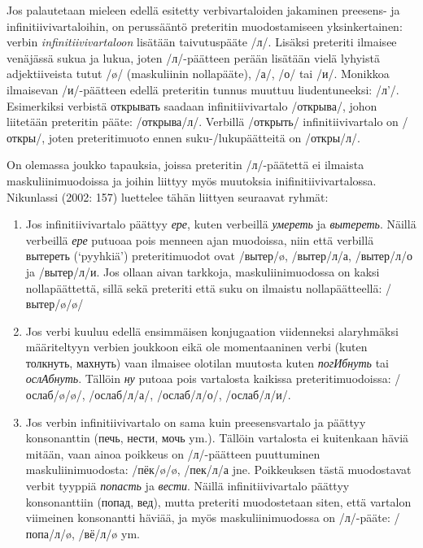 \documentclass[]{scrreprt}
\providecommand{\tightlist}{%
  \setlength{\itemsep}{0pt}\setlength{\parskip}{0pt}}
\begin{document}
Jos palautetaan mieleen edellä esitetty verbivartaloiden jakaminen
preesens- ja infinitiivivartaloihin, on perussääntö preteritin
muodostamiseen yksinkertainen: verbin \emph{infinitiivivartaloon}
lisätään taivutuspääte /л/. Lisäksi preteriti ilmaisee venäjässä sukua
ja lukua, joten /л/-päätteen perään lisätään vielä lyhyistä
adjektiiveista tutut /ø/ (maskuliinin nollapääte), /а/, /о/ tai /и/.
Monikkoa ilmaisevan /и/-päätteen edellä preteritin tunnus muuttuu
liudentuneeksi: /л'/. Esimerkiksi verbistä открывать saadaan
infinitiivivartalo /открыва/, johon liitetään preteritin pääte:
/открыва/л/. Verbillä /открыть/ infinitiivivartalo on /откры/, joten
preteritimuoto ennen suku-/lukupäätteitä on /откры/л/.

On olemassa joukko tapauksia, joissa preteritin /л/-päätettä ei ilmaista
maskuliinimuodoissa ja joihin liittyy myös muutoksia
inifinitiivivartalossa. Nikunlassi (2002: 157) luettelee tähän liittyen
seuraavat ryhmät:

\begin{enumerate}
\def\labelenumi{\arabic{enumi}.}
\tightlist
\item
  Jos infinitiivivartalo päättyy \emph{ере}, kuten verbeillä
  \emph{умереть} ja \emph{вытереть}. Näillä verbeillä \emph{ере} putuoaa
  pois menneen ajan muodoissa, niin että verbillä вытереть (`pyyhkiä')
  preteritimuodot ovat /вытер/ø, /вытер/л/а, /вытер/л/о ja /вытер/л/и.
  Jos ollaan aivan tarkkoja, maskuliinimuodossa on kaksi nollapäättettä,
  sillä sekä preteriti että suku on ilmaistu nollapäätteellä:
  /вытер/ø/ø/
\item
  Jos verbi kuuluu edellä ensimmäisen konjugaation viidenneksi
  alaryhmäksi määriteltyyn verbien joukkoon eikä ole momentaaninen verbi
  (kuten толкнуть, махнуть) vaan ilmaisee olotilan muutosta kuten
  \emph{погИбнуть} tai \emph{ослАбнуть}. Tällöin \emph{ну} putoaa pois
  vartalosta kaikissa preteritimuodoissa: /ослаб/ø/ø/, /ослаб/л/а/,
  /ослаб/л/о/, /ослаб/л/и/.
\item
  Jos verbin infinitiivivartalo on sama kuin preesensvartalo ja päättyy
  konsonanttin (печь, нести, мочь ym.). Tällöin vartalosta ei kuitenkaan
  häviä mitään, vaan ainoa poikkeus on /л/-päätteen puuttuminen
  maskuliinimuodosta: /пёк/ø/ø, /пек/л/а jne. Poikkeuksen tästä
  muodostavat verbit tyyppiä \emph{попасть} ja \emph{вести}. Näillä
  infinitiivivartalo päättyy konsonanttiin (попад, вед), mutta preteriti
  muodostetaan siten, että vartalon viimeinen konsonantti häviää, ja
  myös maskuliinimuodossa on /л/-pääte: /попа/л/ø, /вё/л/ø ym.
\end{enumerate}
\end{document}
